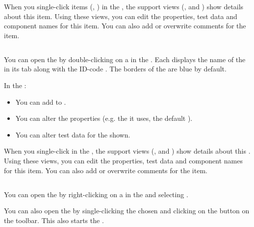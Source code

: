 When you single-click items (\gdcases{}, \gdsteps{}) in the \gdtestcaseeditor{}, the support views (\gdpropview{}, \gdcompnamesview{} and \gddatasetsview{}) show details about this item. Using these views, you can edit the properties, test data and component names for this item. You can also add or overwrite comments for the item. 

\subsection{\gdtestsuiteeditor}
You can open the \gdtestsuiteeditor{} by double-clicking on a \gdsuite{} in the \gdtestsuitebrowser{}. 
Each \gdtestsuiteeditor{} displays the name of the \gdsuite{} in its tab along with the ID-code . The borders of the \gdtestsuiteeditor{} are blue by default. 

In the \gdtestsuiteeditor{}:
\begin{itemize}
\item You can add \gdcases{} to \gdsuites{}. 
\item You can alter the \gdsuite{} properties (e.g. the \gdaut{} it uses, the default \gdehandlers{}).
\item You can alter test data for the \gdcases{} shown. 
 \end{itemize}
 


 When you single-click \gdcases{} in the \gdtestsuiteeditor{}, the support views (\gdpropview{}, \gdcompnamesview{} and \gddatasetsview{}) show details about this \gdcase{}. Using these views, you can edit the properties, test data and component names for this item. You can also add or overwrite comments for the item. 

\subsection{\gdomeditor}

You can open the  \gdomeditor{} by right-clicking on a \gdsuite{} in the \gdtestsuitebrowser{} and selecting . 

You can also open the \gdomeditor{} by single-clicking the chosen \gdsuite{} and clicking on the  button on the toolbar. This also starts the \gdomm{}. 

